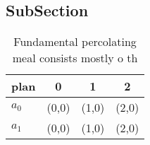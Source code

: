 \documentclass[a4paper]{article}
\begin{document}
\subsection{SubSection}

\begin{table}
\begin{adjustbox}{width=0.6\columnwidth}
\begin{tabular}{|l|l|l|l|}
\hline
\textbf{plan} & \multicolumn{1}{c|}{\textbf{0}} & \multicolumn{1}{c|}{\textbf{1}} & \multicolumn{1}{c|}{\textbf{2}} \\ \hline
\textbf{$a_0$}  & (0,0) & (1,0) & (2,0) \\ \hline
\textbf{$a_1$}  & (0,0) & (1,0) & (2,0) \\ \hline
\end{tabular}
\end{adjustbox}
\caption{Fundamental percolating meal consists mostly o th
}
\end{table}
\end{document}
